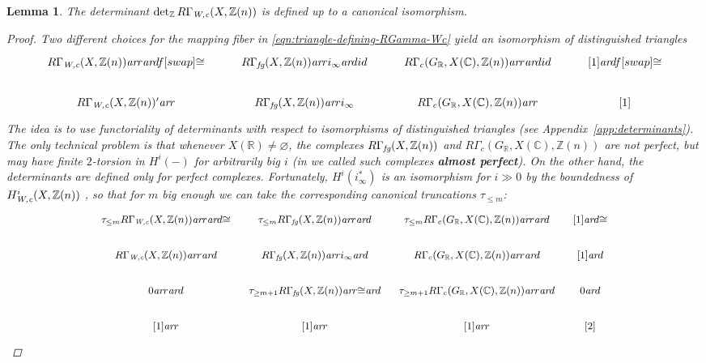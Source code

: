 \documentclass[10pt,a4paper,oneside,draft]{article}
\newcommand{\CC}{\mathbb{C}}
\newcommand{\RR}{\mathbb{R}}
\newcommand{\ZZ}{\mathbb{Z}}
\renewcommand{\det}{\operatorname{det}}
\renewcommand{\emptyset}{\varnothing}
\newcommand{\ar}{\text{\it ar}}
\newcommand{\fg}{\text{\it fg}}
\newcommand{\Wc}{\text{\it W,c}}
\theoremstyle{myplain}
\newtheorem{lemma}[theorem]{Lemma}
\theoremstyle{mydefinition}
\numberwithin{equation}{section}
\begin{document}
\begin{lemma}
  \label{lemma:determinant-of-RGamma-Wc-well-defined}
  The determinant $\det_\ZZ R\Gamma_\Wc (X, \ZZ(n))$ is defined up to a
  canonical isomorphism.

  \begin{proof}
    Two different choices for the mapping fiber in
    \eqref{eqn:triangle-defining-RGamma-Wc} yield an isomorphism of
    distinguished triangles
    \[ \begin{tikzcd}
        R\Gamma_\Wc (X, \ZZ(n)) \ar{r}\ar{d}{f}[swap]{\cong} & R\Gamma_\fg (X,\ZZ(n)) \ar{r}{i_\infty}\ar{d}{id} & R\Gamma_c (G_\RR, X (\CC), \ZZ (n)) \ar{r}\ar{d}{id} & {[1]}\ar{d}{f}[swap]{\cong} \\
        R\Gamma_\Wc (X, \ZZ(n))' \ar{r} & R\Gamma_\fg (X,\ZZ(n)) \ar{r}{i_\infty} & R\Gamma_c (G_\RR, X (\CC), \ZZ (n)) \ar{r} & {[1]}
      \end{tikzcd} \]
    The idea is to use functoriality of determinants with respect to
    isomorphisms of distinguished triangles
    (see Appendix~\ref{app:determinants}). The only technical problem is that
    whenever $X (\RR) \ne \emptyset$, the complexes $R\Gamma_\fg (X,\ZZ(n))$ and
    $R\Gamma_c (G_\RR, X (\CC), \ZZ (n))$ are not perfect, but may have finite
    $2$-torsion in $H^i (-)$ for arbitrarily big $i$ (in
    \cite{Beshenov-Weil-etale-1} we called such complexes \textbf{almost
      perfect}). On the other hand, the determinants are defined only for
    perfect complexes. Fortunately, $H^i (i_\infty^*)$ is an isomorphism for
    $i \gg 0$ by the boundedness of $H^i_\Wc (X, \ZZ(n))$
    \cite[Proposition~7.12]{Beshenov-Weil-etale-1}, so that for $m$ big enough
    we can take the corresponding canonical truncations $\tau_{\le m}$:
    \[ \begin{tikzcd}[row sep=1.5em, column sep=0.75em, font=\small]
        \tau_{\le m} R\Gamma_\Wc (X, \ZZ(n)) \ar{r}\ar{d}{\cong} & \tau_{\le m} R\Gamma_\fg (X,\ZZ(n)) \ar{r}\ar{d} & \tau_{\le m} R\Gamma_c (G_\RR, X (\CC), \ZZ (n)) \ar{r}\ar{d} & {[1]}\ar{d}{\cong} \\
        R\Gamma_\Wc (X, \ZZ(n)) \ar{r}\ar{d} & R\Gamma_\fg (X,\ZZ(n)) \ar{r}{i_\infty}\ar{d} & R\Gamma_c (G_\RR, X (\CC), \ZZ (n)) \ar{r}\ar{d} & {[1]}\ar{d} \\
        0 \ar{r}\ar{d} & \tau_{\ge m+1} R\Gamma_\fg (X,\ZZ(n)) \ar{r}{\cong}\ar{d} & \tau_{\ge m+1} R\Gamma_c (G_\RR, X (\CC), \ZZ (n)) \ar{r}\ar{d} & 0\ar{d} \\
        {[1]} \ar{r} & {[1]} \ar{r} & {[1]} \ar{r} & {[2]}
      \end{tikzcd} \]


\end{proof}
\end{lemma}
\end{document}
